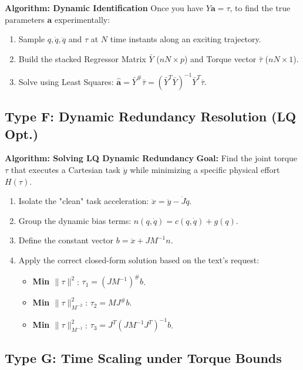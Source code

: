 \documentclass[11pt,a4paper]{article}
\begin{document}
 \textbf{Algorithm: Dynamic Identification}
Once you have $Y\mathbf{a} = \tau$, to find the true parameters $\mathbf{a}$ experimentally:
\begin{enumerate}
    \item Sample $q, \dot{q}, \ddot{q}$ and $\tau$ at $N$ time instants along an exciting trajectory.
    \item Build the stacked Regressor Matrix $\bar{Y}$ ($nN \times p$) and Torque vector $\bar{\tau}$ ($nN \times 1$).
    \item Solve using Least Squares: $\hat{\mathbf{a}} = \bar{Y}^\# \bar{\tau} = (\bar{Y}^T \bar{Y})^{-1} \bar{Y}^T \bar{\tau}$.
\end{enumerate}
\subsection{Type F: Dynamic Redundancy Resolution (LQ Opt.)}

 \textbf{Algorithm: Solving LQ Dynamic Redundancy}
\textbf{Goal:} Find the joint torque $\tau$ that executes a Cartesian task $\ddot{y}$ while minimizing a specific physical effort $H(\tau)$.
\begin{enumerate}
    \item Isolate the "clean" task acceleration: $\ddot{x} = \ddot{y} - \dot{J}\dot{q}$.
    \item Group the dynamic bias terms: $n(q,\dot{q}) = c(q,\dot{q}) + g(q)$.
    \item Define the constant vector $b = \ddot{x} + J M^{-1}n$.
    \item Apply the correct closed-form solution based on the text's request:
    \begin{itemize}
        \item \textbf{Min $\| \tau \|^2$}: $\tau_1 = (J M^{-1})^\# b$.
        \item \textbf{Min $\| \tau \|^2_{M^{-2}}$}: $\tau_2 = M J^\# b$.
        \item \textbf{Min $\| \tau \|^2_{M^{-1}}$}: $\tau_3 = J^T (J M^{-1} J^T)^{-1} b$.
    \end{itemize}
\end{enumerate}
\subsection{Type G: Time Scaling under Torque Bounds}
\end{document}
